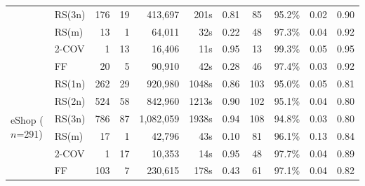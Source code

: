 \begin{table}[htbp]
{\begin{tabular}{ll|rrrr|ccc|cc}
    & RS(3n)  & 176 & 19 & 413,697   & 201s      & 0.81 & 85  & 95.2\% & 0.02 & 0.90 \\
    & RS(m)   & 13  & 1  & 64,011    & 32s       & 0.22 & 48  & 97.3\% & 0.04 & 0.92 \\
    & 2-COV   & 1   & 13 & 16,406    & 11s       & 0.95 & 13  & 99.3\% & 0.05 & 0.95 \\
    & FF      & 20  & 5  & 90,910    & 42s       & 0.28 & 46  & 97.4\% & 0.03 & 0.92 \\
\midrule
\multirow{6}{*}{eShop ($n$=291)}
    & RS(1n)  & 262 & 29 & 920,980   & 1048s     & 0.86 & 103 & 95.0\% & 0.05 & 0.81 \\
    & RS(2n)  & 524 & 58 & 842,960   & 1213s     & 0.90 & 102 & 95.1\% & 0.04 & 0.80 \\
    & RS(3n)  & 786 & 87 & 1,082,059 & 1938s     & 0.94 & 108 & 94.8\% & 0.03 & 0.80 \\
    & RS(m)   & 17  & 1  & 42,796    & 43s       & 0.10 & 81  & 96.1\% & 0.13 & 0.84 \\
    & 2-COV   & 1   & 17 & 10,353    & 14s       & 0.95 & 48  & 97.7\% & 0.04 & 0.89 \\
    & FF      & 103 & 7  & 230,615   & 178s      & 0.43 & 61  & 97.1\% & 0.04 & 0.82 \\
\bottomrule
\end{tabular}%
}
\end{table}


